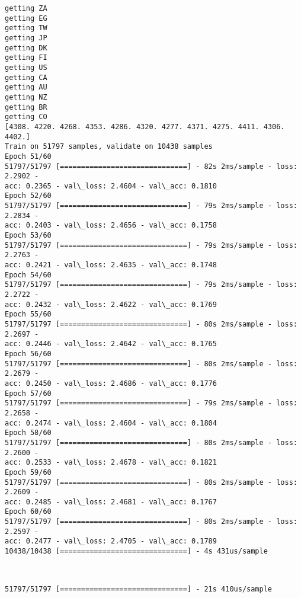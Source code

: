 \documentclass[11pt]{article}
\begin{document}
    \begin{Verbatim}[commandchars=\\\{\}]
getting ZA
getting EG
getting TW
getting JP
getting DK
getting FI
getting US
getting CA
getting AU
getting NZ
getting BR
getting CO
[4308. 4220. 4268. 4353. 4286. 4320. 4277. 4371. 4275. 4411. 4306. 4402.]
Train on 51797 samples, validate on 10438 samples
Epoch 51/60
51797/51797 [==============================] - 82s 2ms/sample - loss: 2.2902 -
acc: 0.2365 - val\_loss: 2.4604 - val\_acc: 0.1810
Epoch 52/60
51797/51797 [==============================] - 79s 2ms/sample - loss: 2.2834 -
acc: 0.2403 - val\_loss: 2.4656 - val\_acc: 0.1758
Epoch 53/60
51797/51797 [==============================] - 79s 2ms/sample - loss: 2.2763 -
acc: 0.2421 - val\_loss: 2.4635 - val\_acc: 0.1748
Epoch 54/60
51797/51797 [==============================] - 79s 2ms/sample - loss: 2.2722 -
acc: 0.2432 - val\_loss: 2.4622 - val\_acc: 0.1769
Epoch 55/60
51797/51797 [==============================] - 80s 2ms/sample - loss: 2.2697 -
acc: 0.2446 - val\_loss: 2.4642 - val\_acc: 0.1765
Epoch 56/60
51797/51797 [==============================] - 80s 2ms/sample - loss: 2.2679 -
acc: 0.2450 - val\_loss: 2.4686 - val\_acc: 0.1776
Epoch 57/60
51797/51797 [==============================] - 79s 2ms/sample - loss: 2.2658 -
acc: 0.2474 - val\_loss: 2.4604 - val\_acc: 0.1804
Epoch 58/60
51797/51797 [==============================] - 80s 2ms/sample - loss: 2.2600 -
acc: 0.2533 - val\_loss: 2.4678 - val\_acc: 0.1821
Epoch 59/60
51797/51797 [==============================] - 80s 2ms/sample - loss: 2.2609 -
acc: 0.2485 - val\_loss: 2.4681 - val\_acc: 0.1767
Epoch 60/60
51797/51797 [==============================] - 80s 2ms/sample - loss: 2.2597 -
acc: 0.2477 - val\_loss: 2.4705 - val\_acc: 0.1789
10438/10438 [==============================] - 4s 431us/sample
    \end{Verbatim}

    \begin{center}
    \end{center}
    { \hspace*{\fill} \\}
    
    \begin{Verbatim}[commandchars=\\\{\}]
51797/51797 [==============================] - 21s 410us/sample
    \end{Verbatim}

    \begin{center}
    \end{center}
    { \hspace*{\fill} \\}
    
\end{document}
